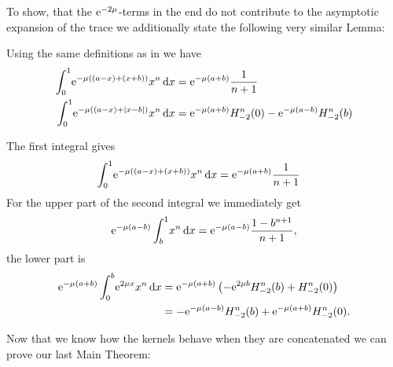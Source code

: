 To show, that the $\Eto{-2\mu}$-terms in the end do not contribute to the
asymptotic expansion of the trace we additionally state the following very
similar Lemma:
\begin{Lemma}
  \label{lem:asymp-2}
  Using the same definitions as in  we have
  \begin{align*}
    \Int{x}{\Eto{-\mu((a-x) + (x+b))}x^n} &= \Eto{-\mu(a+b)}\frac{1}{n+1} \\
\Int{x}{\Eto{-\mu((a-x) + \Abs{x-b})}x^n} &= \Eto{-\mu(a+b)}H^n_{-2}(0) -
    \Eto{-\mu(a-b)}H^n_{-2}(b)
  \end{align*}
  \begin{Proof}
    The first integral gives
    \begin{align*}
      \Int{x}{\Eto{-\mu((a-x)+(x+b))}x^n} &= \Eto{-\mu(a+b)}\frac{1}{n+1}
    \end{align*}
    For the upper part of the second integral we immediately get
    \begin{align*}
      \Eto{-\mu(a-b)}\Integ[1]{b}{x}{x^n} =
      \Eto{-\mu(a-b)}\frac{1-b^{n+1}}{n+1},
    \end{align*}
    the lower part is
    \begin{align*}
      \Eto{-\mu(a+b)}\Integ[b]{0}{x}{\Eto{2\mu x}x^n} &=
      \Eto{-\mu(a+b)}\left(-\Eto{2\mu b}H^n_{-2}(b) + H^n_{-2}(0)\right) \\
      &= -\Eto{-\mu(a-b)}H^n_{-2}(b) + \Eto{-\mu(a+b)}H^n_{-2}(0).
    \end{align*}
  \end{Proof}
\end{Lemma}
Now that we know how the kernels behave when they are concatenated we can prove
our last Main Theorem:
